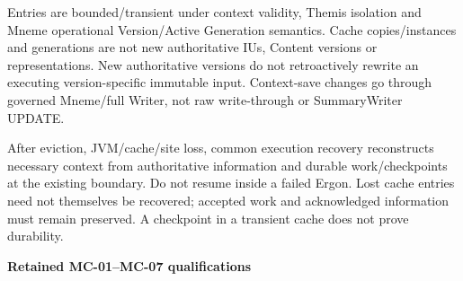 Entries are bounded/transient under context validity, Themis isolation and Mneme operational Version/Active Generation semantics. Cache copies/instances and generations are not new authoritative IUs, Content versions or representations. New authoritative versions do not retroactively rewrite an executing version-specific immutable input. Context-save changes go through governed Mneme/full Writer, not raw write-through or SummaryWriter UPDATE.



After eviction, JVM/cache/site loss, common execution recovery reconstructs necessary context from authoritative information and durable work/checkpoints at the existing boundary. Do not resume inside a failed Ergon. Lost cache entries need not themselves be recovered; accepted work and acknowledged information must remain preserved. A checkpoint in a transient cache does not prove durability.



\par\medskip\textbf{Retained MC-01–MC-07 qualifications}\par


